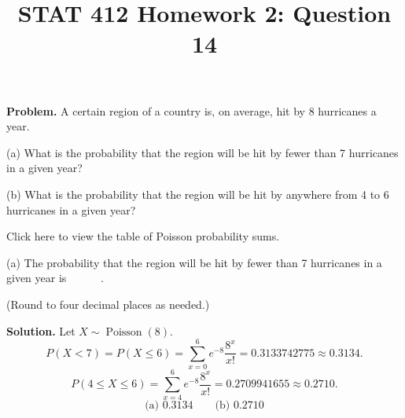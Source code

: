\documentclass[11pt]{article}
\title{STAT 412 Homework 2: Question 14}
\author{}
\date{}
\begin{document}
\maketitle
\textbf{Problem.} A certain region of a country is, on average, hit by 8
hurricanes a year.

(a) What is the probability that the region will be hit by fewer than 7
hurricanes in a given year?

(b) What is the probability that the region will be hit by anywhere from 4 to
6 hurricanes in a given year?

Click here to view the table of Poisson probability sums.

(a) The probability that the region will be hit by fewer than 7 hurricanes in
a given year is \(\boxed{\phantom{0.0000}}\).

(Round to four decimal places as needed.)

\textbf{Solution.} Let \(X\sim\operatorname{Poisson}(8)\).
\[
P(X<7)=P(X\le6)=\sum_{x=0}^{6}e^{-8}\frac{8^x}{x!}
=0.3133742775\approx0.3134.
\]
\[
P(4\le X\le6)=\sum_{x=4}^{6}e^{-8}\frac{8^x}{x!}
=0.2709941655\approx0.2710.
\]
\[
\boxed{\text{(a) }0.3134\qquad\text{(b) }0.2710}
\]
\end{document}
